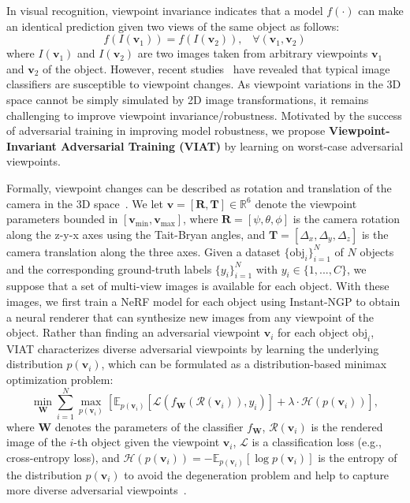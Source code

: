 \documentclass[10pt,journal,compsoc]{IEEEtran}
\begin{document}
In visual recognition, viewpoint invariance indicates that a model $f(\cdot)$ can make an identical prediction given two views of the same object as follows:
\begin{equation}
f(I(\mathbf{v}_1))=f(I(\mathbf{v}_2)), \;\;\; \forall (\mathbf{v}_1, \mathbf{v}_2)
\end{equation}
where $I(\mathbf{v}_1)$ and $I(\mathbf{v}_2)$ are two images taken from arbitrary viewpoints $\mathbf{v}_1$ and $\mathbf{v}_2$ of the object. However, recent studies~\cite{barbu2019objectnet,dong2022viewfool,alcorn2019strike} have revealed that typical image classifiers are susceptible to viewpoint changes. As viewpoint variations in the 3D space cannot be simply simulated by 2D image transformations, it remains challenging to improve viewpoint invariance/robustness. Motivated by the success of adversarial training in improving model robustness, we propose \textbf{Viewpoint-Invariant Adversarial Training (VIAT)} by learning on worst-case adversarial viewpoints.

Formally, viewpoint changes can be described as rotation and translation of the camera in the 3D space~\cite{dong2022viewfool}. We let $\mathbf{v} = [\mathbf{R}, \mathbf{T}] \in \mathbb{R}^6$ denote the viewpoint parameters bounded in $[\mathbf{v}_{\min}, \mathbf{v}_{\max}]$, where $ \mathbf{R}=[\psi,\theta,\phi]$ is the camera rotation along the z-y-x axes using the Tait-Bryan angles, and $ \mathbf{T}=[\Delta _x,\Delta _y,\Delta_z]$ is the camera translation along the three axes.
Given a dataset $\{\mathrm{obj}_i\}_{i=1}^ N$ of $N$ objects and the corresponding ground-truth labels $\{y_i\}_{i=1}^N$ with $y_i\in\{1,...,C\}$, we suppose that a set of multi-view images is available for each object. With these images, we first train a NeRF model for each object using Instant-NGP to obtain a neural renderer that can synthesize new images from any viewpoint of the object. Rather than finding an adversarial viewpoint $\mathbf{v}_i$ for each object $\mathrm{obj}_i$, VIAT characterizes diverse adversarial viewpoints by learning the underlying distribution $p(\mathbf{v}_i)$, which can be formulated as a distribution-based minimax optimization problem:
\begin{equation}
\min_{\mathbf{W}}\!\sum_{i=1}^{N}   \max_{p(\mathbf{v}_i ) }\left [ \mathbb{E}_{p(\mathbf{v}_i )}\! \left [  \mathcal{L}\left(f_{\mathbf{W}}\left (\mathcal{R}(\mathbf{v}_i )  \right ), y_i\right )\right ]\! + \!\lambda\! \cdot\!\mathcal{H}(p(\mathbf{v}_i))\right ]\!,
\label{eq: AT formulation}
\end{equation}
where $\mathbf{W}$ denotes the parameters of the classifier $f_{\mathbf{W}}$, $\mathcal{R}(\mathbf{v}_i)$ is the rendered image of the $i$-th object given the viewpoint $\mathbf{v}_i$, $\mathcal{L}$ is a classification loss (e.g., cross-entropy loss), and $\mathcal{H}(p(\mathbf{v}_i))=-\mathbb{E}_{p(\mathbf{v}_i)}[\log p(\mathbf{v}_i)]$ is the entropy of the distribution $p(\mathbf{v}_i)$ to avoid the degeneration problem and help to capture more diverse adversarial viewpoints~\cite{dong2022viewfool}.
\end{document}

